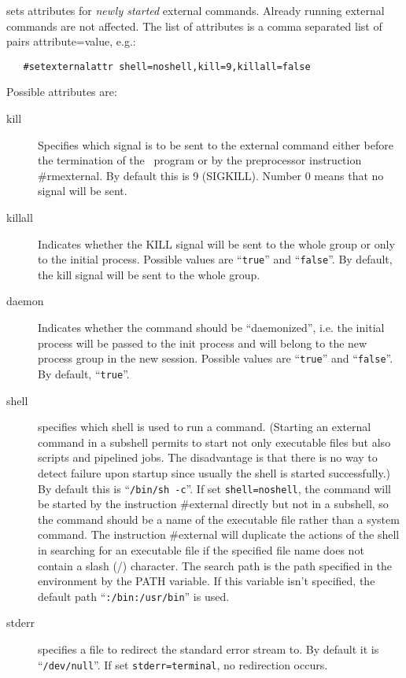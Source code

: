 \noindent sets attributes for {\em newly started} 
external commands. Already running external commands are not affected. The 
list of attributes is a comma separated list of pairs attribute=value, 
e.g.:
\begin{verbatim}
   #setexternalattr shell=noshell,kill=9,killall=false
\end{verbatim}
Possible attributes are:
\begin{description}
\item[kill]
Specifies which signal is to be sent to the external command either before 
the termination of the \FORM\ program or by the preprocessor instruction 
\#rmexternal. By default this is 9 
(SIGKILL). Number 0 means that no signal will be 
sent.
\item[killall] Indicates whether the KILL 
signal will be sent to the whole group or only to the initial process. 
Possible values are ``\verb|true|'' and ``\verb|false|''. By default, the 
kill signal will be sent to the whole group.
\item[daemon]
Indicates whether the command should be ``daemonized'', i.e. 
the initial process will be passed to the init process and will belong
to the new process group in the new session.  
Possible values are ``\verb|true|'' and ``\verb|false|''. By default, 
``\verb|true|''.
\item[shell]
specifies which shell is used to run a command. (Starting an 
external command in a subshell permits to start not only executable files 
but also scripts and pipelined jobs. The disadvantage is that there is no 
way to detect failure upon startup since usually the shell is started 
successfully.) By default this is ``\verb|/bin/sh -c|''.  If set 
\verb|shell=noshell|, the command will be started by the instruction 
\#external directly but not in a subshell, so the command 
should be a name of the executable file rather than a system command. The 
instruction \#external will duplicate the actions of the shell in searching 
for an executable file if the specified file name does not contain a slash 
(/) character.  The search path is the path specified in 
the environment by the PATH variable.  If this variable isn't 
specified, the default path ``\verb|:/bin:/usr/bin|'' is used.
\item[stderr]
specifies a file to redirect the standard error stream 
to. By default it is ``\verb|/dev/null|''. If set \verb|stderr=terminal|,
no redirection occurs.
\end{description}
